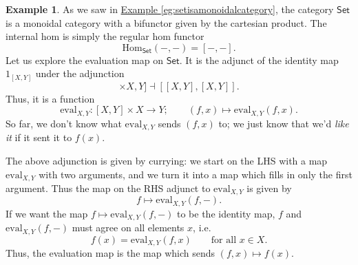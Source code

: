 \documentclass[a4paper,10pt]{scrreprt}
\newcommand{\Hom}{\mathrm{Hom}}
\newcommand{\ev}{\mathrm{eval}}
\theoremstyle{definition}
\newtheorem{example}{Example}[section]
\theoremstyle{plain}
\theoremstyle{remark}
\begin{document}
\begin{example}
  \label{eg:evaluationmapinset}
  As we saw in \hyperref[eg:setisamonoidalcategory]{Example \ref*{eg:setisamonoidalcategory}}, the category $\mathsf{Set}$ is a monoidal category with a bifunctor given by the cartesian product. The internal hom is simply the regular hom functor 
  \begin{equation*}
    \Hom_{\mathsf{Set}}(-,-) = [-,-].
  \end{equation*}
  Let us explore the evaluation map on $\mathsf{Set}$. It is the adjunct of the identity map $1_{[X, Y]}$ under the adjunction
  \begin{equation*}
    [[X, Y] \times X, Y] \dashv [[X, Y], [X, Y]].
  \end{equation*}
  Thus, it is a function 
  \begin{equation*}
    \ev_{X, Y}\colon [X, Y] \times X \to Y;\qquad (f, x) \mapsto \ev_{X, Y}(f, x).
  \end{equation*}
  So far, we don't know what $\ev_{X, Y}$ sends $(f, x)$ to; we just know that we'd \emph{like it} if it sent it to $f(x)$.

  The above adjunction is given by currying: we start on the LHS with a map $\ev_{X, Y}$ with two arguments, and we turn it into a map which fills in only the first argument. Thus the map on the RHS adjunct to $\ev_{X, Y}$ is given by 
  \begin{equation*}
    f \mapsto \ev_{X, Y}(f, -).
  \end{equation*}
  If we want the map $f \mapsto \ev_{X, Y}(f, -)$ to be the identity map, $f$ and $\ev_{X, Y}(f, -)$ must agree on all elements $x$, i.e.
  \begin{equation*}
    f(x) = \ev_{X, Y}(f, x)\qquad\text{for all }x \in X.
  \end{equation*}
  Thus, the evaluation map is the map which sends $(f, x) \mapsto f(x)$.
\end{example}
\end{document}
